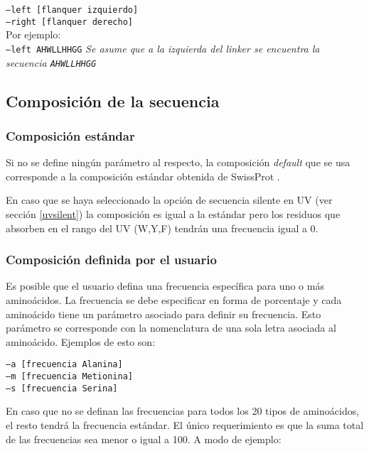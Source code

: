 \indent \texttt{--left  [flanquer izquierdo]} \\
\indent \texttt{--right [flanquer derecho]} 
\\Por ejemplo: \\
\indent \texttt{--left AHWLLHHGG} \hspace{0.5cm} \textit{Se asume que a la izquierda del linker se encuentra la secuencia \texttt{AHWLLHHGG}}





\subsection{Composición de la secuencia} \label{composicion}

\subsubsection{Composición estándar}
Si no se define ningún parámetro al respecto, la composición \textit{default} que se usa corresponde a la composición estándar obtenida de SwissProt \cite{compositionAA}.  

En caso que se haya seleccionado la opción de secuencia silente en UV (ver sección \ref{uvsilent}) la composición es igual a la estándar pero los residuos que absorben en el rango del UV (W,Y,F) tendrán una frecuencia igual a 0.

\subsubsection{Composición definida por el usuario}

Es posible que el usuario defina una frecuencia específica para uno o más aminoácidos. 
La frecuencia se debe especificar en forma de porcentaje y cada aminoácido tiene un parámetro asociado para definir su frecuencia. 
Esto parámetro se corresponde con la nomenclatura de una sola letra asociada al aminoácido. Ejemplos de esto son:

\indent \texttt{--a  [frecuencia Alanina]} \\
\indent \texttt{--m  [frecuencia Metionina]} \\
\indent \texttt{--s  [frecuencia Serina]} 

En caso que no se definan las frecuencias para todos los 20 tipos de aminoácidos, el resto tendrá la frecuencia estándar. El único requerimiento es que la suma total de las frecuencias sea menor o igual a 100.
A modo de ejemplo:

